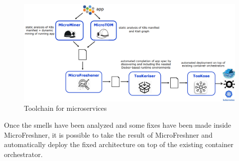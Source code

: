 \begin{figure} [H]
    \centering
    \includegraphics[width=1\textwidth]{images/Microservices/toolchain.PNG}
    \caption{Toolchain for microservices}
    \label{fig:toolchain}
\end{figure} 

Once the smells have been analyzed and some fixes have been made inside MicroFreshner, it is possible to take the result of MicroFreshner and automatically deploy the fixed architecture on top of the existing container orchestrator.

